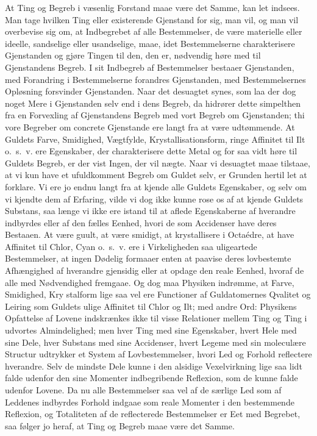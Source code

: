 \documentclass[12pt]{article}
\newcommand{\opage}[1]{\marginnote{\footnotesize\textit{[#1]}}}
\begin{document}
At Ting og Begreb i væsenlig Forstand maae være det
Samme, kan let indsees. Man tage hvilken Ting eller
existerende Gjenstand for sig, man vil, og man vil overbevise sig
om, at Indbegrebet af alle Bestemmelser, de være materielle
eller ideelle, sandselige eller usandselige, maae, idet
Bestemmelserne charakterisere Gjenstanden og gjøre Tingen til den, den
er, nødvendig høre med til Gjenstandens Begreb. I sit
Indbegreb af Bestemmelser bestaaer Gjenstanden, med Forandring
i Bestemmelserne forandres Gjenstanden, med Bestemmelsernes
Opløsning forsvinder Gjenstanden. Naar det desuagtet synes,
som laa der dog noget Mere i Gjenstanden selv end i dens
Begreb, da hidrører dette simpelthen fra en Forvexling af
Gjenstandens Begreb med vort Begreb om Gjenstanden; thi vore
Begreber om concrete Gjenstande ere langt fra at være
udtømmende. At Guldets Farve, Smidighed, Vægtfylde,
Krystallisationsform, ringe Affinitet til Ilt o.\ s.\ v. ere Egenskaber, der
charakterisere dette Metal og for saa vidt høre til Guldets
Begreb, er der vist Ingen, der vil nægte. Naar vi desuagtet maae
tilstaae, at vi kun have et ufuldkomment Begreb om Guldet
selv, er Grunden hertil let at forklare. Vi ere jo endnu langt
fra at kjende alle Guldets Egenskaber, og selv om vi kjendte
dem af Erfaring, vilde vi dog ikke kunne rose os af at kjende
Guldets Substans, saa længe vi ikke ere istand til at aflede
Egenskaberne af hverandre indbyrdes eller af den fælles Eenhed,
hvori de som Accidenser have deres Bestaaen. At være guult,
at være smidigt, at krystallisere i Octaédre, at have Affinitet til
Chlor, Cyan o.\ s.\ v. ere i Virkeligheden saa uligeartede
Bestemmelser, at ingen Dødelig formaaer enten at paavise deres
lovbestemte Afhængighed af hverandre gjensidig eller at opdage
den reale Eenhed, hvoraf de alle med Nødvendighed fremgaae.
Og dog maa Physiken indrømme, at Farve, Smidighed, Kry\-%
\opage{32}stalform lige saa vel ere Functioner af Guldatomernes Qvalitet og
Leiring som Guldets ulige Affinitet til Chlor og Ilt; med andre
Ord: Physikens Opfattelse af Lovene indskrænkes ikke til visse
Relationer mellem Ting og Ting i udvortes Almindelighed; men
hver Ting med sine Egenskaber, hvert Hele med sine Dele,
hver Substans med sine Accidenser, hvert Legeme med sin
moleculære Structur udtrykker et System af Lovbestemmelser,
hvori Led og Forhold reflectere hverandre. Selv de mindste
Dele kunne i den alsidige Vexelvirkning lige saa lidt falde
udenfor den sine Momenter indbegribende Reflexion, som de
kunne falde udenfor Lovene. Da nu alle Bestemmelser saa vel
af de særlige Led som af Leddenes indbyrdes Forhold indgaae
som reale Momenter i den bestemmende Reflexion, og
Totaliteten af de reflecterede Bestemmelser er Eet med Begrebet, saa
følger jo heraf, at Ting og Begreb maae være det Samme.
\end{document}
